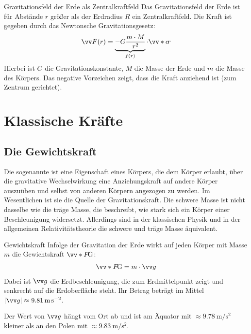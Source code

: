 \begin{rememberbox}{Gravitationsfeld der Erde als Zentralkraftfeld}
    Das Gravitationsfeld der Erde ist für Abstände $r$ größer als der Erdradius $R$ ein Zentralkraftfeld. Die Kraft ist gegeben durch das Newtonsche Gravitationsgesetz:
    \begin{equation}\label{eq: gravitationskraft_allgemein}
        \ivec{F}(r) = \underbrace{-G\frac{m\cdot M}{r^{2}}}_{f(r)}\cdot \ivecS{e}{r}
    \end{equation}
    Hierbei ist $G$ die Gravitationskonstante, $M$ die Masse der Erde und $m$ die Masse des Körpers. Das negative Vorzeichen zeigt, dass die Kraft anziehend ist (zum Zentrum gerichtet).
\end{rememberbox}



\section{Klassische Kräfte}\label{sec: klassische_Kräfte}

\subsection{Die Gewichtskraft}\label{subsec: gewichtskraft}
Die sogenannte  ist eine Eigenschaft eines Körpers, die dem Körper erlaubt, über die gravitative Wechselwirkung eine Anziehungskraft auf andere Körper auszuüben und selbst von anderen Körpern angezogen zu werden. Im Wesentlichen ist sie die Quelle der Gravitationskraft. Die schwere Masse ist nicht dasselbe wie die träge Masse, die beschreibt, wie stark sich ein Körper einer Beschleunigung widersetzt. Allerdings sind in der klassischen Physik und in der allgemeinen Relativitätstheorie die schwere und träge Masse äquivalent. 
\begin{rememberbox}[]{Gewichtskraft}
    Infolge der Gravitation der Erde wirkt auf jeden Körper mit Masse $m$ die Gewichtskraft $\ivecS{F}{\text{G}}$:
    \begin{equation}\label{eq: gewichtskraft_f_eq_mg}
        \ivecS{F}{\text{G}} = m \cdot \ivec{g}
    \end{equation}
    Dabei ist $\ivec{g}$ die Erdbeschleunigung, die zum Erdmittelpunkt zeigt und senkrecht auf die Erdoberfläche steht. Ihr Betrag beträgt im Mittel $|\ivec{g}| \approx \SI{9.81}{\meter\per\second\squared}$.
\end{rememberbox}
Der Wert von $\ivec{g}$ hängt vom Ort ab und ist am Äquator mit $\approx \SI{9.78}{\meter\per\second\squared}$ kleiner als an den Polen mit $\approx \SI{9.83}{\meter\per\second\squared}$. \\

